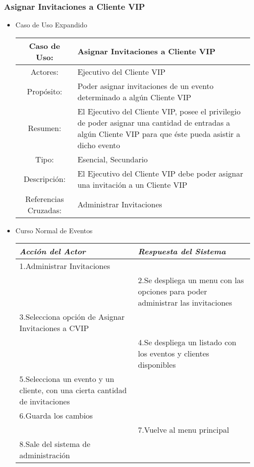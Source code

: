 \subsubsection{Asignar Invitaciones a Cliente VIP}
\begin{itemize}
	\item Caso de Uso Expandido\\
		\begin{tabular}{|c|p{9.5cm}|}\hline
			Caso de Uso: & Asignar Invitaciones a Cliente VIP\\\hline
			Actores: & Ejecutivo del Cliente VIP\\\hline
			Propósito: & Poder asignar invitaciones de un evento determinado a algún Cliente VIP\\\hline
			Resumen: & El Ejecutivo del Cliente VIP, posee el privilegio de poder asignar una cantidad de entradas a algún Cliente VIP para que éste pueda asistir a dicho evento\\\hline
			Tipo: & Esencial, Secundario\\\hline
			Descripción: &El Ejecutivo del Cliente VIP debe poder asignar una invitación a un Cliente VIP \\\hline
			Referencias Cruzadas: & Administrar Invitaciones\\\hline
		\end{tabular}

	\item Curso Normal de Eventos\\
		\begin{tabular}{|p{6.6cm}|p{6.6cm}|}\hline
			\emph{Acción del Actor} & \emph{Respuesta del Sistema}\\\hline
			1.Administrar Invitaciones&\\\hline
			&2.Se despliega un menu con las opciones para poder administrar las invitaciones\\\hline
			3.Selecciona opción de Asignar Invitaciones a CVIP&\\\hline
			&4.Se despliega un listado con los eventos y clientes disponibles\\\hline
			5.Selecciona un evento y un cliente, con una cierta cantidad de invitaciones&\\\hline
			6.Guarda los cambios&\\\hline
			&7.Vuelve al menu principal\\\hline
			8.Sale del sistema de administración&\\\hline
		\end{tabular}


\end{itemize}
